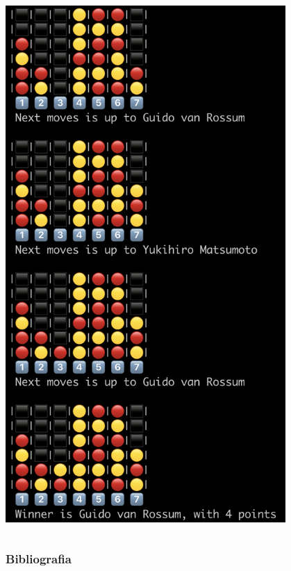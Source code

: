 \documentclass{beamer}
\begin{document}
\begin{frame}
\begin{columns}
        \includegraphics[width=0.8\textwidth]{img/gameend.png}
    \end{columns}
  \end{frame}




  \begin{frame}[noframenumbering]
    \frametitle{Bibliografia}
    \printbibliography
  \end{frame}
  
\end{document}
